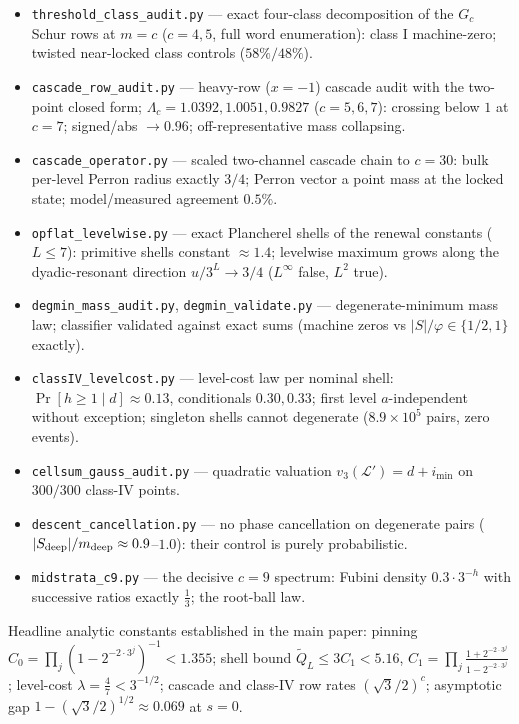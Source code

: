 \documentclass[11pt]{article}
\theoremstyle{remark}
\begin{document}
\begin{itemize}
\item\texttt{threshold\_class\_audit.py} --- exact four-class
decomposition of the $G_c$ Schur rows at $m=c$ ($c=4,5$, full word
enumeration): class I machine-zero; twisted near-locked class controls
($58\%/48\%$).
\item\texttt{cascade\_row\_audit.py} --- heavy-row ($x=-1$) cascade audit
with the two-point closed form; $\Lambda_c=1.0392,1.0051,0.9827$
($c=5,6,7$): crossing below $1$ at $c=7$; signed/abs $\to0.96$;
off-representative mass collapsing.
\item\texttt{cascade\_operator.py} --- scaled two-channel cascade chain to
$c=30$: bulk per-level Perron radius exactly $3/4$; Perron vector a point
mass at the locked state; model/measured agreement $0.5\%$.
\item\texttt{opflat\_levelwise.py} --- exact Plancherel shells of the
renewal constants ($L\le7$): primitive shells constant $\approx1.4$;
levelwise maximum grows along the dyadic-resonant direction
$u/3^L\to3/4$ ($L^\infty$ false, $L^2$ true).
\item\texttt{degmin\_mass\_audit.py}, \texttt{degmin\_validate.py} ---
degenerate-minimum mass law; classifier validated against exact sums
(machine zeros vs $|S|/\varphi\in\{1/2,1\}$ exactly).
\item\texttt{classIV\_levelcost.py} --- level-cost law per nominal shell:
$\Pr[h\ge1\mid d]\approx0.13$, conditionals $0.30,0.33$; first level
$a$-independent without exception; singleton shells cannot degenerate
($8.9\times10^5$ pairs, zero events).
\item\texttt{cellsum\_gauss\_audit.py} --- quadratic valuation
$v_3(\mathcal L')=d+i_{\min}$ on $300/300$ class-IV points.
\item\texttt{descent\_cancellation.py} --- no phase cancellation on
degenerate pairs ($|S_{\rm deep}|/m_{\rm deep}\approx0.9$--$1.0$): their
control is purely probabilistic.
\item\texttt{midstrata\_c9.py} --- the decisive $c=9$ spectrum: Fubini
density $0.3\cdot3^{-h}$ with successive ratios exactly $\tfrac13$; the
root-ball law.
\end{itemize}

\noindent Headline analytic constants established in the main paper:
pinning $C_0=\prod_j(1-2^{-2\cdot3^j})^{-1}<1.355$; shell bound
$\tilde Q_L\le3C_1<5.16$, $C_1=\prod_j\frac{1+2^{-2\cdot3^j}}{1-2^{-2\cdot3^j}}$;
level-cost $\lambda=\frac47<3^{-1/2}$; cascade and class-IV row rates
$(\sqrt3/2)^c$; asymptotic gap $1-(\sqrt3/2)^{1/2}\approx0.069$ at $s=0$.
\end{document}

